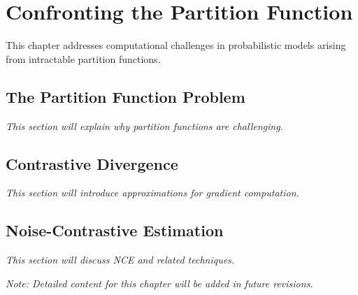 
\chapter{Confronting the Partition Function}
\label{chap:partition-function}

This chapter addresses computational challenges in probabilistic models arising from intractable partition functions.

\section{The Partition Function Problem}

\textit{This section will explain why partition functions are challenging.}

\section{Contrastive Divergence}

\textit{This section will introduce approximations for gradient computation.}

\section{Noise-Contrastive Estimation}

\textit{This section will discuss NCE and related techniques.}

\vspace{1em}
\noindent\textit{Note: Detailed content for this chapter will be added in future revisions.}
